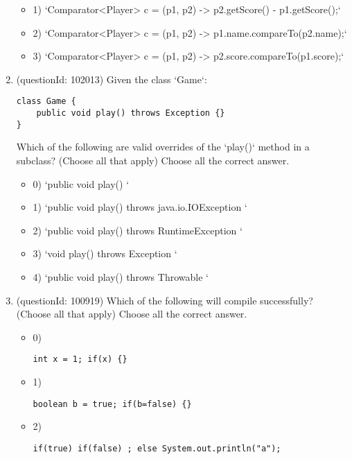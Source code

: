 \documentclass[12pt]{article}
\begin{document}
\begin{enumerate}[label=(\arabic*)]
\begin{itemize}
\item 1) `Comparator<Player> c = (p1, p2) -> p2.getScore() - p1.getScore();`

\item 2) `Comparator<Player> c = (p1, p2) -> p1.name.compareTo(p2.name);`

\item 3) `Comparator<Player> c = (p1, p2) -> p2.score.compareTo(p1.score);`

\end{itemize}
\item (questionId: 102013) Given the class `Game`:
\begin{verbatim}
class Game {
    public void play() throws Exception {}
}
\end{verbatim}
Which of the following are valid overrides of the `play()` method in a subclass? (Choose all that apply)
Choose all the correct answer.\begin{itemize}
\item 0) `public void play() {}`

\item 1) `public void play() throws java.io.IOException {}`

\item 2) `public void play() throws RuntimeException {}`

\item 3) `void play() throws Exception {}`

\item 4) `public void play() throws Throwable {}`

\end{itemize}
\item (questionId: 100919) Which of the following will compile successfully? (Choose all that apply)
Choose all the correct answer.\begin{itemize}
\item 0) \begin{verbatim}int x = 1; if(x) {}
\end{verbatim}

\item 1) \begin{verbatim}boolean b = true; if(b=false) {}
\end{verbatim}

\item 2) \begin{verbatim}if(true) if(false) ; else System.out.println("a");
\end{verbatim}


\end{itemize}
\end{enumerate}
\end{document}
